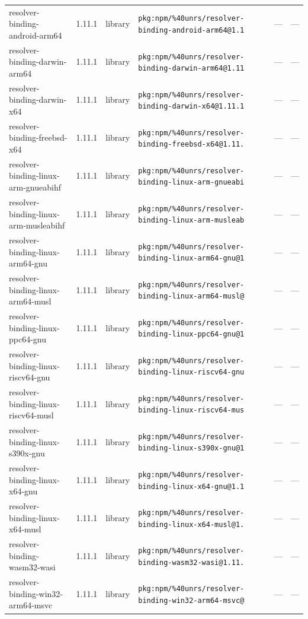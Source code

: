 \documentclass[11pt]{article}
\begin{document}
\begin{longtable}{|l|l|l|p{2.2cm}|l|p{4cm}|}
resolver-binding-android-arm64 & 1.11.1 & library & \texttt{pkg:npm/\%40unrs/resolver-binding-android-arm64@1.1} & — & — \\
resolver-binding-darwin-arm64 & 1.11.1 & library & \texttt{pkg:npm/\%40unrs/resolver-binding-darwin-arm64@1.11} & — & — \\
resolver-binding-darwin-x64 & 1.11.1 & library & \texttt{pkg:npm/\%40unrs/resolver-binding-darwin-x64@1.11.1} & — & — \\
resolver-binding-freebsd-x64 & 1.11.1 & library & \texttt{pkg:npm/\%40unrs/resolver-binding-freebsd-x64@1.11.} & — & — \\
resolver-binding-linux-arm-gnueabihf & 1.11.1 & library & \texttt{pkg:npm/\%40unrs/resolver-binding-linux-arm-gnueabi} & — & — \\
resolver-binding-linux-arm-musleabihf & 1.11.1 & library & \texttt{pkg:npm/\%40unrs/resolver-binding-linux-arm-musleab} & — & — \\
resolver-binding-linux-arm64-gnu & 1.11.1 & library & \texttt{pkg:npm/\%40unrs/resolver-binding-linux-arm64-gnu@1} & — & — \\
resolver-binding-linux-arm64-musl & 1.11.1 & library & \texttt{pkg:npm/\%40unrs/resolver-binding-linux-arm64-musl@} & — & — \\
resolver-binding-linux-ppc64-gnu & 1.11.1 & library & \texttt{pkg:npm/\%40unrs/resolver-binding-linux-ppc64-gnu@1} & — & — \\
resolver-binding-linux-riscv64-gnu & 1.11.1 & library & \texttt{pkg:npm/\%40unrs/resolver-binding-linux-riscv64-gnu} & — & — \\
resolver-binding-linux-riscv64-musl & 1.11.1 & library & \texttt{pkg:npm/\%40unrs/resolver-binding-linux-riscv64-mus} & — & — \\
resolver-binding-linux-s390x-gnu & 1.11.1 & library & \texttt{pkg:npm/\%40unrs/resolver-binding-linux-s390x-gnu@1} & — & — \\
resolver-binding-linux-x64-gnu & 1.11.1 & library & \texttt{pkg:npm/\%40unrs/resolver-binding-linux-x64-gnu@1.1} & — & — \\
resolver-binding-linux-x64-musl & 1.11.1 & library & \texttt{pkg:npm/\%40unrs/resolver-binding-linux-x64-musl@1.} & — & — \\
resolver-binding-wasm32-wasi & 1.11.1 & library & \texttt{pkg:npm/\%40unrs/resolver-binding-wasm32-wasi@1.11.} & — & — \\
resolver-binding-win32-arm64-msvc & 1.11.1 & library & \texttt{pkg:npm/\%40unrs/resolver-binding-win32-arm64-msvc@} & — & — \\

\end{longtable}
\end{document}
